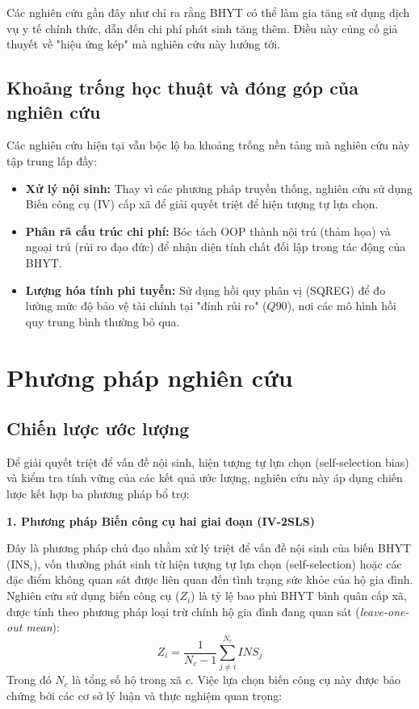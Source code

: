 \documentclass[12pt,a4paper]{article}
\begin{document}
Các nghiên cứu gần đây như \textcite{thuong2020bmj} chỉ ra rằng BHYT có thể làm gia tăng sử dụng dịch vụ y tế chính thức, dẫn đến chi phí phát sinh tăng thêm. Điều này củng cố giả thuyết về "hiệu ứng kép" mà nghiên cứu này hướng tới.

\subsection{Khoảng trống học thuật và đóng góp của nghiên cứu}

Các nghiên cứu hiện tại vẫn bộc lộ ba khoảng trống nền tảng mà nghiên cứu này tập trung lấp đầy:

\begin{itemize}
	\item \textbf{Xử lý nội sinh:} Thay vì các phương pháp truyền thống, nghiên cứu sử dụng Biến công cụ (IV) cấp xã để giải quyết triệt để hiện tượng tự lựa chọn.
	\item \textbf{Phân rã cấu trúc chi phí:} Bóc tách OOP thành nội trú (thảm họa) và ngoại trú (rủi ro đạo đức) để nhận diện tính chất đối lập trong tác động của BHYT.
	\item \textbf{Lượng hóa tính phi tuyến:} Sử dụng hồi quy phân vị (SQREG) để đo lường mức độ bảo vệ tài chính tại "đỉnh rủi ro" ($Q90$), nơi các mô hình hồi quy trung bình thường bỏ qua.
\end{itemize}

\section{Phương pháp nghiên cứu}
\subsection{Chiến lược ước lượng}

Để giải quyết triệt để vấn đề nội sinh, hiện tượng tự lựa chọn (self-selection bias) và kiểm tra tính vững của các kết quả ước lượng, nghiên cứu này áp dụng chiến lược kết hợp ba phương pháp bổ trợ:

\textbf{1. Phương pháp Biến công cụ hai giai đoạn (IV-2SLS)}

Đây là phương pháp chủ đạo nhằm xử lý triệt để vấn đề nội sinh của biến BHYT ($\text{INS}_i$), vốn thường phát sinh từ hiện tượng tự lựa chọn (self-selection) hoặc các đặc điểm không quan sát được liên quan đến tình trạng sức khỏe của hộ gia đình. Nghiên cứu sử dụng biến công cụ ($Z_i$) là tỷ lệ bao phủ BHYT bình quân cấp xã, được tính theo phương pháp loại trừ chính hộ gia đình đang quan sát (\textit{leave-one-out mean}):
\begin{equation}
	Z_i = \frac{1}{N_{c}-1} \sum_{j \neq i}^{N_{c}} INS_{j}
\end{equation}
Trong đó $N_c$ là tổng số hộ trong xã $c$. Việc lựa chọn biến công cụ này được bảo chứng bởi các cơ sở lý luận và thực nghiệm quan trọng:
\end{document}
